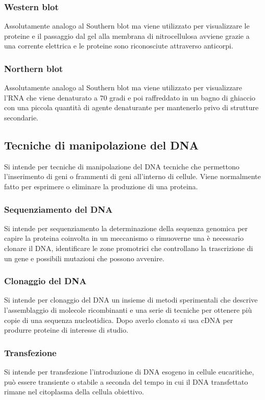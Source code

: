 \subsubsection{Western blot}
Assolutamente analogo al Southern blot ma viene utilizzato per visualizzare le proteine e il passaggio dal gel alla membrana di nitrocellulosa avviene grazie a una corrente elettrica e 
le proteine sono riconosciute attraverso anticorpi. 
\subsubsection{Northern blot}
Assolutamente analogo al Southern blot ma viene utilizzato per visualizzare l'RNA che viene denaturato a $70$ gradi e poi raffreddato in un bagno di ghiaccio con una piccola quantit\`a 
di agente denaturante per mantenerlo privo di strutture secondarie.  
\subsection{Tecniche di manipolazione del DNA}
Si intende per tecniche di manipolazione del DNA tecniche che permettono l'inserimento di geni o frammenti di geni all'interno di cellule. Viene normalmente fatto per esprimere o 
eliminare la produzione di una proteina.
\subsubsection{Sequenziamento del DNA}
Si intende per sequenziamento la determinazione della sequenza genomica per capire la proteina coinvolta in un meccanismo o rimuoverne una \`e necessario clonare il DNA, identificare le
zone promotrici che controllano la trascrizione di un gene e possibili mutazioni che possono avvenire.
\subsubsection{Clonaggio del DNA}
Si intende per clonaggio del DNA un insieme di metodi sperimentali che descrive l'assemblaggio di molecole ricombinanti e una serie di tecniche per ottenere pi\`u copie di una sequenza 
nucleotidica. Dopo averlo clonato si usa cDNA per produrre proteine di interesse di studio.
\subsubsection{Transfezione}
Si intende per transfezione l'introduzione di DNA esogeno in cellule eucaritiche, pu\`o essere transiente o stabile a seconda del tempo in cui il DNA transfettato rimane nel citoplasma
della cellula obiettivo. 
